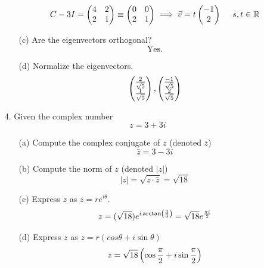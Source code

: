 \documentclass[english, 11pt]{article}
\newcommand{\mtx}[1]{\left(\begin{matrix}#1\end{matrix}\right)}
\begin{document}
\begin{itemize}
\begin{itemize}
           \[ C - 3I = \mtx{4 & 2 \\ 2 & 1 } \equiv \mtx{0 & 0 \\ 2 & 1} \implies \vv = t\mtx{-1 \\ 2} \ \ \ \ s, t \in \R\]
         \item[(c)] Are the eigenvectors orthogonal?
         \[ \mbox{Yes.} \]
         \item[(d)] Normalize the eigenvectors.
         \[ \mtx{\f{2}{\sqrt{5}} \\ \f{1}{\sqrt{5}}}, \mtx{\f{-1}{\sqrt{5}} \\ \f{2}{\sqrt{5}}} \]
       \end{itemize}
       \item[4.] Given the complex number
       \[ z = 3 + 3i \]
       \begin{itemize}
         \item[(a)] Compute the complex conjugate of $z$ (denoted $\bar{z}$)
            \[ \bar{z} = 3 - 3i \]
         \item[(b)] Compute the norm of $z$ (denoted $|z|$)
            \[ |z| = \sqrt{z\cdot \bar{z}} = \sqrt{18} \]
         \item[(c)] Express $z$ as $z = re^{i\theta}$.
            \[ z = (\sqrt{18})e^{i\arctan\left( \frac{3}{3} \right)} = \sqrt{18}e^{\frac{\pi i}{2}} \]
         \item[(d)] Express $z$ as $z = r(cos\theta + i\sin\theta)$
             \[ z = \sqrt{18}\left(\cos \frac{\pi}{2} + i\sin \frac{\pi}{2}\right) \]
       \end{itemize}
     \end{itemize}

  
\end{document}
